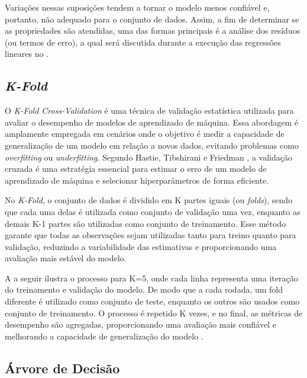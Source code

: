 Variações nessas suposições tendem a tornar o modelo menos confiável e, portanto, não adequado para o conjunto de dados. Assim, a fim de determinar se as propriedades são atendidas, uma das formas principais é a análise dos resíduos (ou termos de erro), a qual será discutida durante a execução das regressões lineares no .

\subsection{\textit{K-Fold}}
O \textit{K-Fold Cross-Validation} é uma técnica de validação estatística utilizada para avaliar o desempenho de modelos de aprendizado de máquina. Essa abordagem é amplamente empregada em cenários onde o objetivo é medir a capacidade de generalização de um modelo em relação a novos dados, evitando problemas como \textit{overfitting} ou \textit{underfitting}. Segundo Hastie, Tibshirani e Friedman \cite{hastie2009elements}, a validação cruzada é uma estratégia essencial para estimar o erro de um modelo de aprendizado de máquina e selecionar hiperparâmetros de forma eficiente.

No \textit{K-Fold}, o conjunto de dados é dividido em K partes iguais (ou 
\textit{folds}), sendo que cada uma delas é utilizada como conjunto de validação uma vez, enquanto as demais K-1 partes são utilizadas como conjunto de treinamento. Esse método garante que todas as observações sejam utilizadas tanto para treino quanto para validação, reduzindo a variabilidade das estimativas e proporcionando uma avaliação mais estável do modelo.

A  a seguir ilustra o processo para K=5, onde cada linha representa uma iteração do treinamento e validação do modelo. De modo que a cada rodada, um fold diferente é utilizado como conjunto de teste, enquanto os outros são usados como conjunto de treinamento. O processo é repetido K vezes, e no final, as métricas de desempenho são agregadas, proporcionando uma avaliação mais confiável e melhorando a capacidade de generalização do modelo \cite{hastie2009elements}.

%

\subsection{Árvore de Decisão}

